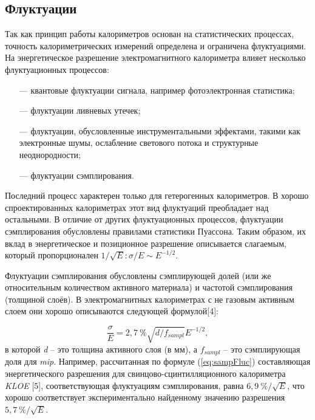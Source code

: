\subsection{Флуктуации} \label{chap2.2}

Так  как  принцип  работы  калориметров  основан  на статистических процессах, точность калориметрических измерений определена и ограничена флуктуациями.   На   энергетическое   разрешение   электромагнитного калориметра влияет несколько флуктуационных процессов:

 \begin{itemize}[leftmargin=1.6\parindent, wide]
 	\item[---] квантовые   флуктуации   сигнала,   например   фотоэлектронная статистика;
 		\item[---] флуктуации ливневых утечек;
 			\item[---] флуктуации, обусловленные инструментальными эффектами, такими как  электронные  шумы,  ослабление  светового  потока  и  структурные неоднородности;
 				\item[---] флуктуации сэмплирования.
 \end{itemize}
 
 Последний процесс характерен только для гетерогенных калориметров. В хорошо спроектированных калориметрах этот вид флуктуаций преобладает над  остальными.  В  отличие  от  других  флуктуационных  процессов, флуктуации  сэмплирования  обусловлены  правилами  статистики  Пуассона. Таким  образом,  их  вклад  в  энергетическое  и  позиционное  разрешение описывается слагаемым, который пропорционален $1/\sqrt{E}:\sigma /E \sim E^{- 1/2}$.
 
 Флуктуации  сэмплирования  обусловлены  сэмплирующей  долей (или же   относительным   количеством   активного   материала)   и   частотой сэмплирования  (толщиной  слоёв).  В  электромагнитных  калориметрах  с  не газовым  активным  слоем  они  хорошо  описываются  следующей  формулой[4]:
 
\begin{equation}\label{eq:sampFluc}
\frac{\sigma}{E}=2,7\ \%\sqrt{ d/f_{sampl} }E^{-1/2},
\end{equation}
в которой \textit{d} – это толщина активного слоя (в мм), а $f_{sampl}$ – это сэмплирующая доля для \textit{mip}. Например, рассчитанная по формуле (\ref{eq:sampFluc}) составляющая энергетического разрешения для свинцово-сцинтилляционного калориметра \textit{KLOE} [5], соответствующая флуктуациям  сэмплирования, равна $6,9\ \%/\sqrt{E}$, что хорошо соответствует  экспериментально  найденному  значению  разрешения $5,7\ \%/\sqrt{E}$.

